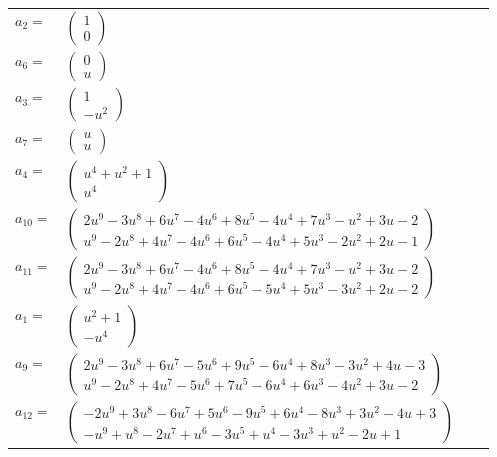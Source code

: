 \documentclass[1p]{elsarticle_modified}
\theoremstyle{definition}
\begin{document}
\begin{tabular}{m{7pt} m{180pt} m{7pt} m{180pt} }
\flushright $a_{2}=$&$\begin{pmatrix}1\\0\end{pmatrix}$ \\
\flushright $a_{6}=$&$\begin{pmatrix}0\\u\end{pmatrix}$ \\
\flushright $a_{3}=$&$\begin{pmatrix}1\\- u^2\end{pmatrix}$ \\
\flushright $a_{7}=$&$\begin{pmatrix}u\\u\end{pmatrix}$ \\
\flushright $a_{4}=$&$\begin{pmatrix}u^4+u^2+1\\u^4\end{pmatrix}$ \\
\flushright $a_{10}=$&$\begin{pmatrix}2 u^9-3 u^8+6 u^7-4 u^6+8 u^5-4 u^4+7 u^3- u^2+3 u-2\\u^9-2 u^8+4 u^7-4 u^6+6 u^5-4 u^4+5 u^3-2 u^2+2 u-1\end{pmatrix}$ \\
\flushright $a_{11}=$&$\begin{pmatrix}2 u^9-3 u^8+6 u^7-4 u^6+8 u^5-4 u^4+7 u^3- u^2+3 u-2\\u^9-2 u^8+4 u^7-4 u^6+6 u^5-5 u^4+5 u^3-3 u^2+2 u-2\end{pmatrix}$ \\
\flushright $a_{1}=$&$\begin{pmatrix}u^2+1\\- u^4\end{pmatrix}$ \\
\flushright $a_{9}=$&$\begin{pmatrix}2 u^9-3 u^8+6 u^7-5 u^6+9 u^5-6 u^4+8 u^3-3 u^2+4 u-3\\u^9-2 u^8+4 u^7-5 u^6+7 u^5-6 u^4+6 u^3-4 u^2+3 u-2\end{pmatrix}$ \\
\flushright $a_{12}=$&$\begin{pmatrix}-2 u^9+3 u^8-6 u^7+5 u^6-9 u^5+6 u^4-8 u^3+3 u^2-4 u+3\\- u^9+u^8-2 u^7+u^6-3 u^5+u^4-3 u^3+u^2-2 u+1\end{pmatrix}$ \\

\end{tabular}
\end{document}
